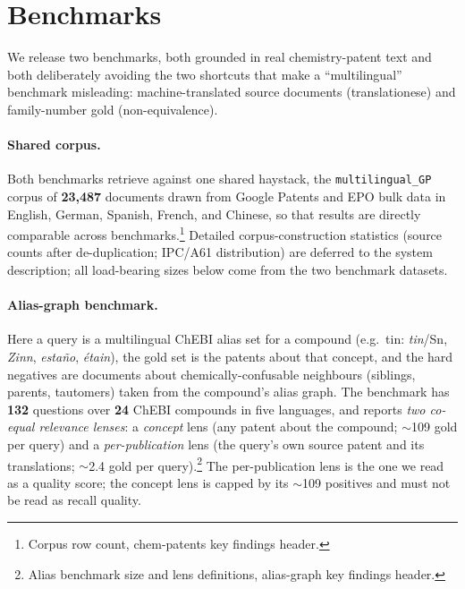\documentclass[11pt]{article}
\begin{document}
\section{Benchmarks}
\label{sec:benchmarks}

We release two benchmarks, both grounded in real chemistry-patent text and both
deliberately avoiding the two shortcuts that make a ``multilingual'' benchmark
misleading: machine-translated source documents (translationese) and
family-number gold (non-equivalence).

\paragraph{Shared corpus.}
Both benchmarks retrieve against one shared haystack, the
\texttt{multilingual\_GP} corpus of \textbf{23{,}487} documents drawn from
Google Patents and EPO bulk data in English, German, Spanish, French, and
Chinese, so that results are directly comparable across benchmarks.\footnote{%
Corpus row count, chem-patents key findings header.} Detailed
corpus-construction statistics (source counts after de-duplication; IPC/A61
distribution) are deferred to the system description; all load-bearing sizes
below come from the two benchmark datasets.

\paragraph{Alias-graph benchmark.}
Here a query is a multilingual ChEBI alias set for a compound (e.g.\ tin:
\emph{tin}/Sn, \emph{Zinn}, \emph{esta\~no}, \emph{\'etain}), the gold set is the
patents about that concept, and the hard negatives are documents about
chemically-confusable neighbours (siblings, parents, tautomers) taken from the
compound's alias graph. The benchmark has \textbf{132} questions over
\textbf{24} ChEBI compounds in five languages, and reports \emph{two co-equal
relevance lenses}: a \emph{concept} lens (any patent about the compound;
$\sim$109 gold per query) and a \emph{per-publication} lens (the query's own
source patent and its translations; $\sim$2.4 gold per query).\footnote{Alias
benchmark size and lens definitions, alias-graph key findings header.} The
per-publication lens is the one we read as a quality score; the concept lens is
capped by its $\sim$109 positives and must not be read as recall quality.
\end{document}
